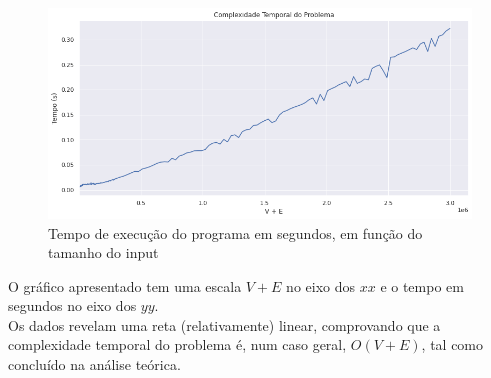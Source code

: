 \documentclass[12pt,a4paper]{article}
\begin{document}
  \begin{figure}[h]
    \includegraphics[width=1\textwidth]{report.png}
    \caption{Tempo de execução do programa em segundos, em função do tamanho do input}
  \end{figure}
  
  O gráfico apresentado tem uma escala $V + E$ no eixo dos $xx$ e o tempo em segundos no eixo dos $yy$.\\
  Os dados revelam uma reta (relativamente) linear, comprovando que a complexidade temporal do problema é, num caso geral, $O(V + E)$, tal como concluído na análise teórica.
\end{document}
